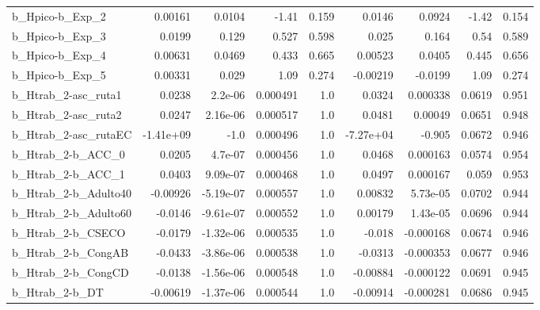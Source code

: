 \begin{tabular}{lrrrrrrrr}
b\_Hpico-b\_Exp\_2            &     0.00161 &       0.0104 &     -1.41 &    0.159 &     0.0146 &      0.0924 &        -1.42 &         0.154 \\
b\_Hpico-b\_Exp\_3            &      0.0199 &        0.129 &     0.527 &    0.598 &      0.025 &       0.164 &         0.54 &         0.589 \\
b\_Hpico-b\_Exp\_4            &     0.00631 &       0.0469 &     0.433 &    0.665 &    0.00523 &      0.0405 &        0.445 &         0.656 \\
b\_Hpico-b\_Exp\_5            &     0.00331 &        0.029 &      1.09 &    0.274 &   -0.00219 &     -0.0199 &         1.09 &         0.274 \\
b\_Htrab\_2-asc\_ruta1        &      0.0238 &      2.2e-06 &  0.000491 &      1.0 &     0.0324 &    0.000338 &       0.0619 &         0.951 \\
b\_Htrab\_2-asc\_ruta2        &      0.0247 &     2.16e-06 &  0.000517 &      1.0 &     0.0481 &     0.00049 &       0.0651 &         0.948 \\
b\_Htrab\_2-asc\_rutaEC       &   -1.41e+09 &         -1.0 &  0.000496 &      1.0 &  -7.27e+04 &      -0.905 &       0.0672 &         0.946 \\
b\_Htrab\_2-b\_ACC\_0          &      0.0205 &      4.7e-07 &  0.000456 &      1.0 &     0.0468 &    0.000163 &       0.0574 &         0.954 \\
b\_Htrab\_2-b\_ACC\_1          &      0.0403 &     9.09e-07 &  0.000468 &      1.0 &     0.0497 &    0.000167 &        0.059 &         0.953 \\
b\_Htrab\_2-b\_Adulto40       &    -0.00926 &    -5.19e-07 &  0.000557 &      1.0 &    0.00832 &    5.73e-05 &       0.0702 &         0.944 \\
b\_Htrab\_2-b\_Adulto60       &     -0.0146 &    -9.61e-07 &  0.000552 &      1.0 &    0.00179 &    1.43e-05 &       0.0696 &         0.944 \\
b\_Htrab\_2-b\_CSECO          &     -0.0179 &    -1.32e-06 &  0.000535 &      1.0 &     -0.018 &   -0.000168 &       0.0674 &         0.946 \\
b\_Htrab\_2-b\_CongAB         &     -0.0433 &    -3.86e-06 &  0.000538 &      1.0 &    -0.0313 &   -0.000353 &       0.0677 &         0.946 \\
b\_Htrab\_2-b\_CongCD         &     -0.0138 &    -1.56e-06 &  0.000548 &      1.0 &   -0.00884 &   -0.000122 &       0.0691 &         0.945 \\
b\_Htrab\_2-b\_DT             &    -0.00619 &    -1.37e-06 &  0.000544 &      1.0 &   -0.00914 &   -0.000281 &       0.0686 &         0.945 \\

\end{tabular}
